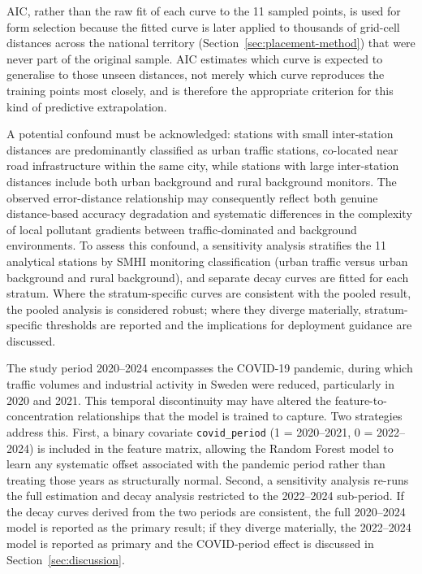\documentclass[11pt,a4paper]{article}
\begin{document}
AIC, rather than the raw fit of each curve to the 11 sampled points, is used for form selection because the fitted curve is later applied to thousands of grid-cell distances across the national territory (Section~\ref{sec:placement-method}) that were never part of the original sample. AIC estimates which curve is expected to generalise to those unseen distances, not merely which curve reproduces the training points most closely, and is therefore the appropriate criterion for this kind of predictive extrapolation.

A potential confound must be acknowledged: stations with small inter-station distances are predominantly classified as urban traffic stations, co-located near road infrastructure within the same city, while stations with large inter-station distances include both urban background and rural background monitors. The observed error-distance relationship may consequently reflect both genuine distance-based accuracy degradation and systematic differences in the complexity of local pollutant gradients between traffic-dominated and background environments. To assess this confound, a sensitivity analysis stratifies the 11 analytical stations by SMHI monitoring classification (urban traffic versus urban background and rural background), and separate decay curves are fitted for each stratum. Where the stratum-specific curves are consistent with the pooled result, the pooled analysis is considered robust; where they diverge materially, stratum-specific thresholds are reported and the implications for deployment guidance are discussed.

The study period 2020--2024 encompasses the COVID-19 pandemic, during which traffic volumes and industrial activity in Sweden were reduced, particularly in 2020 and 2021. This temporal discontinuity may have altered the feature-to-concentration relationships that the model is trained to capture. Two strategies address this. First, a binary covariate \texttt{covid\_period} (1 = 2020--2021, 0 = 2022--2024) is included in the feature matrix, allowing the Random Forest model to learn any systematic offset associated with the pandemic period rather than treating those years as structurally normal. Second, a sensitivity analysis re-runs the full estimation and decay analysis restricted to the 2022--2024 sub-period. If the decay curves derived from the two periods are consistent, the full 2020--2024 model is reported as the primary result; if they diverge materially, the 2022--2024 model is reported as primary and the COVID-period effect is discussed in Section~\ref{sec:discussion}.
\end{document}
